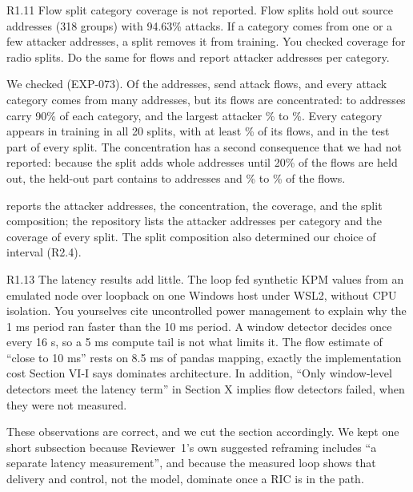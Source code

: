 \label{rv:R1.11}
\begin{concern}{R1.11}
Flow split category coverage is not reported. Flow splits hold out source addresses (318 groups) with 94.63\% attacks. If a category comes from one or a few attacker addresses, a split removes it from training. You checked coverage for radio splits. Do the same for flows and report attacker addresses per category.
\end{concern}
\response We checked (EXP-073). Of the \NSrcGroups{} addresses, \RCovAttackers{} send attack flows, and every attack category comes from many addresses, but its flows are concentrated: \RCovAddrNinetyMin{} to \RCovAddrNinetyMax{} addresses carry 90\% of each category, and the largest attacker \RCovTopShareMin\% to \RCovTopShareMax\%. Every category appears in training in all 20 splits, with at least \RCovMinTrainShare\% of its flows, and in the test part of every split. The concentration has a second consequence that we had not reported: because the split adds whole addresses until 20\% of the flows are held out, the held-out part contains \RCovTestGroupsMin{} to \RCovTestGroupsMax{} addresses and \RCovTestFlowsMin\% to \RCovTestFlowsMax\% of the flows.

\action {} reports the attacker addresses, the concentration, the coverage, and the split composition; the repository lists the attacker addresses per category and the coverage of every split. The split composition also determined our choice of interval (R2.4).



\label{rv:R1.13}
\begin{concern}{R1.13}
The latency results add little. The loop fed synthetic KPM values from an emulated node over loopback on one Windows host under WSL2, without CPU isolation. You yourselves cite uncontrolled power management to explain why the 1 ms period ran faster than the 10 ms period. A window detector decides once every 16 s, so a 5 ms compute tail is not what limits it. The flow estimate of ``close to 10 ms'' rests on 8.5 ms of pandas mapping, exactly the implementation cost Section VI-I says dominates architecture. In addition, ``Only window-level detectors meet the latency term'' in Section X implies flow detectors failed, when they were not measured.
\end{concern}
\response These observations are correct, and we cut the section accordingly. We kept one short subsection because Reviewer~1's own suggested reframing includes ``a separate latency measurement'', and because the measured loop shows that delivery and control, not the model, dominate once a RIC is in the path.

